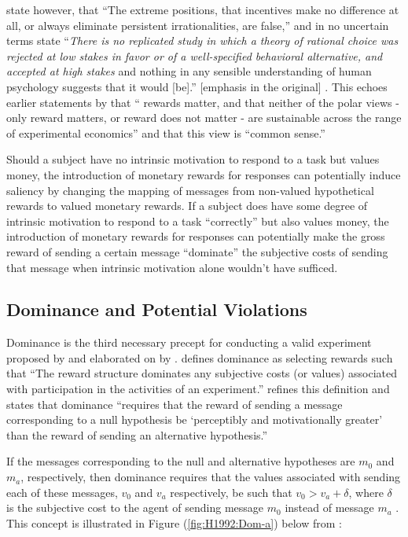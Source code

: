 \documentclass[../main.tex]{subfiles}
\begin{document}
\textcite[8]{Camerer1999} state however, that \enquote{The extreme positions, that  incentives make no difference at all, or always eliminate persistent irrationalities, are false,} and in no uncertain terms state \enquote{\textit{There is no replicated study in which a theory of rational choice was rejected at low stakes in favor or of a well-specified behavioral alternative, and accepted at high stakes} \textelp{} and nothing in any sensible understanding of human psychology suggests that it would [be].} [emphasis in the original] \parencite*[33-34]{Camerer1999}.
This echoes earlier statements by \textcite[246]{Smith1993} that \enquote{\textelp{} rewards matter, and that neither of the polar views - only reward matters, or reward does not matter - are sustainable across the range of experimental economics} and that this view is \enquote{common sense.}

Should a subject have no intrinsic motivation to respond to a task but values money, the introduction of monetary rewards for responses can potentially induce saliency by changing the mapping of messages from non-valued hypothetical rewards to valued monetary rewards.
If a subject does have some degree of intrinsic motivation to respond to a task \enquote{correctly} but also values money, the introduction of monetary rewards for responses can potentially make the gross reward of sending a certain message \enquote{dominate} the subjective costs of sending that message when intrinsic motivation alone wouldn't have sufficed.

\singlespacing
\subsection{Dominance and Potential Violations}
\doublespacing

Dominance is the third necessary precept for conducting a valid experiment proposed by \textcite{Smith1982} and elaborated on by \textcite{Harrison1989, Harrison1992}.
\textcite[934]{Smith1982} defines dominance as selecting rewards such that \enquote{The reward structure dominates any subjective costs (or values) associated with participation in the activities of an experiment.}
\textcite[1426]{Harrison1992} refines this definition and states that dominance \enquote{requires that the reward of sending a message corresponding to a null hypothesis be \enquote{perceptibly and motivationally greater} than the reward of sending an alternative hypothesis.}

If the messages corresponding to the null and alternative hypotheses are $m_0$ and $m_a$, respectively, then dominance requires that the values associated with sending each of these messages, $v_0$ and $v_a$ respectively, be such that $v_0 > v_a + \delta$, where $\delta$ is the subjective cost to the agent of sending message $m_0$ instead of message $m_a$ \parencite[1427]{Harrison1992}.
This concept is illustrated in Figure (\ref{fig:H1992:Dom-a}) below from \textcite[1427]{Harrison1992}:
\end{document}
